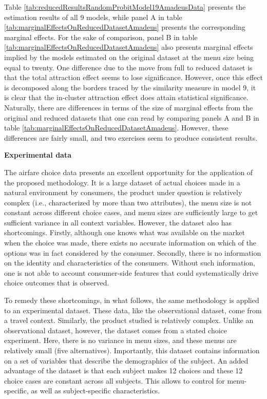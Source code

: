 \documentclass[a4paper,12pt]{article}
\begin{document}
Table \ref{tab:reducedResultsRandomProbitModel19AmadeusData} presents the estimation results of all 9 models, while panel A in table \ref{tab:marginalEffectsOnReducedDatasetAmadeus} presents the corresponding marginal effects. For the sake of comparison, panel B in table \ref{tab:marginalEffectsOnReducedDatasetAmadeus} also presents marginal effects implied by the models estimated on the original dataset at the menu size being equal to twenty. One difference due to the move from full to reduced dataset is that the total attraction effect seems to lose significance. However, once this effect is decomposed along the borders traced by the similarity measure in model 9, it is clear that the in-cluster attraction effect does attain statistical significance. Naturally, there are differences in terms of the size of marginal effects from the original and reduced datasets that one can read by comparing panels A and B in table \ref{tab:marginalEffectsOnReducedDatasetAmadeus}. However, these differences are fairly small, and two exercises seem to produce consistent results.

\textbf{Experimental data}

The airfare choice data presents an excellent opportunity for the application of the proposed methodology. It is a large dataset of actual choices made in a natural environment by consumers, the product under question is relatively complex (i.e., characterized by more than two attributes), the menu size is not constant across different choice cases, and menu sizes are sufficiently large to get sufficient variance in all context variables. However, the dataset also has shortcomings. Firstly, although one knows what was available on the market when the choice was made, there exists no accurate information on which of the options was in fact considered by the consumer. Secondly, there is no information on the identity and characteristics of the consumers. Without such information, one is not able to account consumer-side features that could systematically drive choice outcomes that is observed.

To remedy these shortcomings, in what follows, the same methodology is applied to an experimental dataset. These data, like the observational dataset, come from a travel context. Similarly, the product studied is relatively complex. Unlike an observational dataset, however, the dataset comes from a stated choice experiment. Here, there is no variance in menu sizes, and these menus are relatively small (five alternatives). Importantly, this dataset contains information on a set of variables that describe the demographics of the subject. An added advantage of the dataset is that each subject makes 12 choices and these 12 choice cases are constant across all subjects. This allows to control for menu-specific, as well as subject-specific characteristics.
\end{document}
